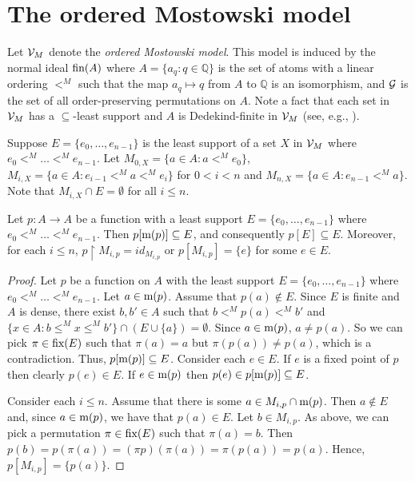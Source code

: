 \section{The ordered Mostowski model}

Let $\mathcal{V}_{M}$ denote the \emph{ordered Mostowski model}. This model is induced by the normal ideal $\textup{fin}(A)$ where $A=\{a_{q}:q\in \mathbb{Q}\}$ is the set of atoms with a linear ordering $<^{M}$ such that the map $a_{q}\mapsto q$ from $A$ to $\mathbb{Q}$ is an isomorphism, and $\mathcal{G}$ is the set of all order-preserving permutations on $A$. Note a fact that each set in $\mathcal{V}_{M}$ has a $\subseteq$-least support and $A$ is Dedekind-finite in $\mathcal{V}_{M}$ (see, e.g., \cite{Jech}).

Suppose $E=\{e_{0},\dotsc,e_{n-1}\}$ is the least support of a set $X$ in $\mathcal{V}_{M}$ where $e_{0}<^{M}\dotsc<^{M}e_{n-1}$. Let $M_{0,X}=\{a\in A:a<^{M}e_{0}\}$, $M_{i,X}=\{a\in A:e_{i-1}<^{M}a<^{M}e_{i}\}$ for $0<i<n$ and $M_{n,X}=\{a\in A:e_{n-1}<^{M}a\}$. Note that $M_{i,X}\cap E=\emptyset$ for all $i\leq n$.

\begin{lemma}\label{VMlemma}
Let $p:A\to A$ be a function with a least support $E=\{e_{0},\dotsc,e_{n-1}\}$ where $e_{0}<^{M}\dotsc<^{M}e_{n-1}$. Then $p[\textup{m}(p)]\subseteq E$, and consequently $p[E]\subseteq E$. Moreover, for each $i\leq n$, $p\restriction M_{i,p}=id_{M_{i,p}}$ or $p[M_{i,p}]=\{e\}$ for some $e\in E$.
\end{lemma}

\begin{proof}
 Let $p$ be a function on $A$ with the least support $E=\{e_{0},\dotsc,e_{n-1}\} $ where $ e_{0}<^{M}\dotsc<^{M}e_{n-1}$. Let $a\in \textup{m}(p)$. Assume that $p(a)\notin E$. Since $E$ is finite and $A$ is dense, there exist $b,b'\in A$ such that $b<^{M}p(a)<^{M}b'$ and $\{x\in A: b\leq^{M} x\leq^{M} b'\}\cap (E\cup \{a\})=\emptyset$. Since $a\in\textup{m}(p)$, $a\neq p(a)$. So we can pick $\pi\in \textup{fix}(E)$ such that $\pi(a)=a$ but $\pi(p(a))\neq p(a)$, which is a contradiction. Thus, $p[\textup{m}(p)]\subseteq E$. Consider each $e\in E$. If $e$ is a fixed point of $p$ then clearly $p(e)\in E$. If $e\in\textup{m}(p)$ then $p(e)\in p[\textup{m}(p)]\subseteq E$.

Consider each $i\leq n$. Assume that there is some $a\in M_{i,p}\cap \textup{m}(p)$. Then $a\not\in E$ and, since $a\in\textup{m}(p)$, we have that $p(a)\in E$. Let $b\in M_{i,p}$. As above, we can pick a permutation $\pi\in\textup{fix}(E)$ such that $\pi(a)=b$. Then $p(b)=p(\pi(a))=(\pi p)(\pi(a))=\pi(p(a))=p(a)$. Hence, $p[M_{i,p}]=\{p(a)\}$.
\end{proof}

